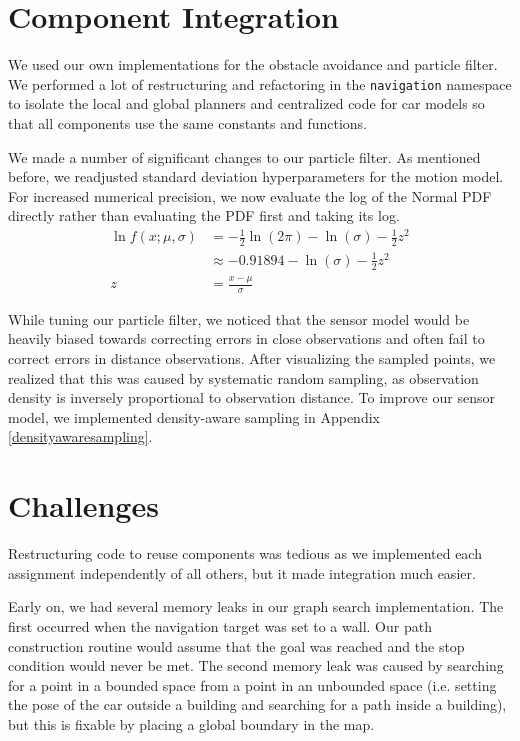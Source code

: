 \documentclass[11pt]{article}
\newcommand{\code}[1]{{\small \tt #1}}
\begin{document}
\section{Component Integration}

We used our own implementations for the obstacle avoidance and particle filter.
We performed a lot of restructuring and refactoring in the \code{navigation}
namespace to isolate the local and global planners and centralized code for car
models so that all components use the same constants and functions.

\bigskip
\noindent
We made a number of significant changes to our particle filter. As mentioned
before, we readjusted standard deviation hyperparameters for the motion model.
For increased numerical precision, we now evaluate the log of the Normal PDF
directly rather than evaluating the PDF first and taking its log.
\begin{align*}
    \ln f(x; \mu, \sigma) &= -\frac{1}{2}\ln(2\pi) - \ln(\sigma) - \frac{1}{2}z^2 \\
    &\approx -0.91894 - \ln(\sigma) - \frac{1}{2}z^2 \\
    z &= \frac{x - \mu}{\sigma}
\end{align*}

\noindent
While tuning our particle filter, we noticed that the sensor model would be
heavily biased towards correcting errors in close observations and often fail to
correct errors in distance observations. After visualizing the sampled points,
we realized that this was caused by systematic random sampling, as observation
density is inversely proportional to observation distance. To improve our sensor
model, we implemented density-aware sampling in Appendix \ref{densityawaresampling}.

\section{Challenges}

Restructuring code to reuse components was tedious as we implemented each assignment
independently of all others, but it made integration much easier.

\bigskip
\noindent
Early on, we had several memory leaks in our graph search implementation. The
first occurred when the navigation target was set to a wall. Our path
construction routine would assume that the goal was reached and the stop
condition would never be met. The second memory leak was caused by searching for
a point in a bounded space from a point in an unbounded space (i.e. setting the
pose of the car outside a building and searching for a path inside a building),
but this is fixable by placing a global boundary in the map.
\end{document}

